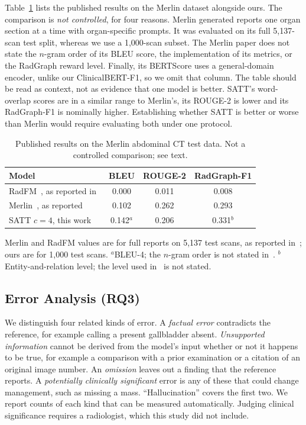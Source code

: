 \documentclass[conference]{IEEEtran}
\begin{document}
Table~\ref{tab:merlin} lists the published results on the Merlin dataset
alongside ours. The comparison is \emph{not controlled}, for four reasons.
Merlin generated reports one organ section at a time with organ-specific
prompts. It was evaluated on its full 5,137-scan test split, whereas we use a
1,000-scan subset. The Merlin paper does not state the $n$-gram order of its
BLEU score, the implementation of its metrics, or the RadGraph reward level.
Finally, its BERTScore uses a general-domain encoder, unlike our
ClinicalBERT-F1, so we omit that column. The table should be read as context,
not as evidence that one model is better. SATT's word-overlap scores are in a
similar range to Merlin's, its ROUGE-2 is lower and its RadGraph-F1 is
nominally higher. Establishing whether SATT is better or worse than Merlin
would require evaluating both under one protocol.

\begin{table}[t]
\centering
\caption{Published results on the Merlin abdominal CT test data. Not a
controlled comparison; see text.}
\label{tab:merlin}
\footnotesize
\setlength{\tabcolsep}{4pt}
\begin{tabular}{@{}lccc@{}}
\toprule
\textbf{Model} & \textbf{BLEU} & \textbf{ROUGE-2} & \textbf{RadGraph-F1} \\
\midrule
RadFM~\cite{radfm}, as reported in~\cite{merlin} & 0.000 & 0.011 & 0.008 \\
Merlin~\cite{merlin}, as reported & 0.102 & 0.262 & 0.293 \\
SATT $c=4$, this work & 0.142$^{a}$ & 0.206 & 0.331$^{b}$ \\
\bottomrule
\end{tabular}

\vspace{2pt}
\parbox{\columnwidth}{\scriptsize Merlin and RadFM values are for full
reports on 5,137 test scans, as reported in~\cite{merlin}; ours are for 1,000
test scans. $^{a}$BLEU-4; the $n$-gram order is not stated in~\cite{merlin}.
$^{b}$Entity-and-relation level; the level used in~\cite{merlin} is not
stated.}
\end{table}

\subsection{Error Analysis (RQ3)}

We distinguish four related kinds of error. A \emph{factual error}
contradicts the reference, for example calling a present gallbladder absent.
\emph{Unsupported information} cannot be derived from the model's input
whether or not it happens to be true, for example a comparison with a prior
examination or a citation of an original image number. An \emph{omission}
leaves out a finding that the reference reports. A \emph{potentially
clinically significant} error is any of these that could change management,
such as missing a mass. ``Hallucination'' covers the first two. We report
counts of each kind that can be measured automatically. Judging clinical
significance requires a radiologist, which this study did not include.
\end{document}
